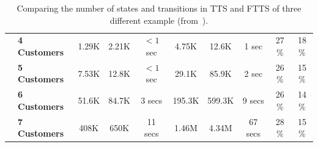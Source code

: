 \begin{table}
\begin{center}
\begin{tabular}{|l|l|c|c|c|c|c|c|c|c|}
        & \textbf{4 Customers} & 1.29K     & 2.21K     & $<1$ sec  & 4.75K     & 12.6K      & 1 sec     & 27$\%$  & 18$\%$   \\
        & \textbf{5 Customers} & 7.53K & 12.8K & $<1$ sec  & 29.1K & 85.9K & 2 sec  & 26$\%$  & 15$\%$   \\
        & \textbf{6 Customers} & 51.6K & 84.7K & 3 secs  & 195.3K & 599.3K  & 9 secs  & 26$\%$  & 14$\% $  \\
        & \textbf{7 Customers} & 408K  & 650K  & 11 secs  & 1.46M  & 4.34M & 67 secs  & 28$\%$  & 15$\% $  \\
        \hline
        \end{tabular}
        \end{center}
        \caption{Comparing the number of states and transitions in TTS and FTTS of three different example (from~\cite{ehsan-phd-thesis}). %
        }
\label{table::TTS-FTTS-experiment}
\end{table}
